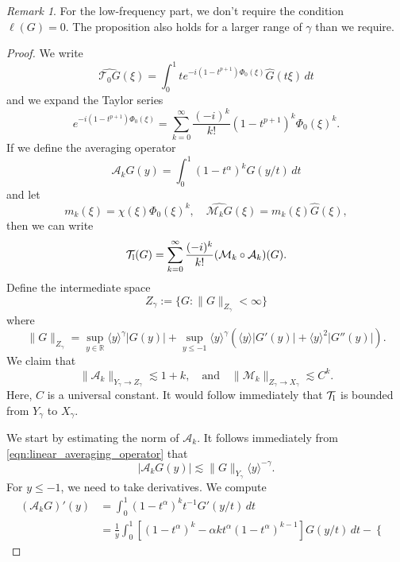 \documentclass[11pt]{amsart}
\theoremstyle{definition}
\theoremstyle{remark}
\newtheorem{remark}[theorem]{Remark}
\numberwithin{equation}{section}
\newcommand{\R}{\mathbb{R}}
\newcommand{\mc}[1]{\mathcal{#1}}
\newcommand{\ang}[1]{\langle #1 \rangle}
\begin{document}
\begin{remark}
    For the low-frequency part, we don't require the condition $\ell(G) = 0$. The proposition also holds for a larger range of $\gamma$ than we require.
\end{remark}

\begin{proof}
    We write 
    \[\widehat{\mc{T}_0 G}(\xi) = \int_0^1 t e^{-i(1-t^{p+1})\Phi_0(\xi)}
    \widehat G(t\xi)\,dt\]
    and we expand the Taylor series
    \[e^{-i(1 - t^{p + 1})\Phi_0(\xi)} = \sum_{k = 0}^{\infty} \frac{(-i)^k}{k!} (1 - t^{p + 1})^k \Phi_0(\xi)^k.\]
    If we define the averaging operator 
    \begin{equation}\label{eqn:linear_averaging_operator}\mc{A}_kG(y) = \int_{0}^{1}(1 - t^\alpha)^kG(y / t) \, dt\end{equation}
    and let 
    \begin{equation}\label{eqn:linear_low_frequency_multipliers}m_k(\xi) = \chi(\xi)\Phi_0(\xi)^k, \quad \widehat{\mc{M}_k G}(\xi) = m_k(\xi)\widehat{G}(\xi),\end{equation} 
    then we can write 
    \begin{equation}\label{eqn:linear_low_frequency_series}\mc{T}_{\textup{l}}(G) = \sum_{k = 0}^{\infty} \frac{(-i)^k}{k!} (\mc{M}_k \circ \mc{A}_k)(G).\end{equation}
    Define the intermediate space
    \[Z_\gamma := \{G : \|G\|_{Z_\gamma} < \infty\}\]
    where
    \[\|G\|_{Z_\gamma} = \sup_{y \in \R}\ang{y}^{\gamma}|G(y)| + \sup_{y \leq -1}\ang{y}^{\gamma}(\ang{y}|G'(y)| + \ang{y}^{2}|G''(y)|).\]
    We claim that
    \begin{equation}\label{eqn:linear_low_frequency_factor_bounds}\|\mc{A}_k\|_{Y_\gamma \to Z_\gamma} \lesssim 1 + k, \quad \text{and} \quad \|\mc{M}_k\|_{Z_\gamma \to X_\gamma} \lesssim C^k.\end{equation}
    Here, $C$ is a universal constant. It would follow immediately that $\mc{T}_{\textup{l}}$ is bounded from $Y_\gamma$ to $X_\gamma$. \par
    We start by estimating the norm of $\mc{A}_k$. It follows immediately from \eqref{eqn:linear_averaging_operator} that
    \[|\mc{A}_kG(y)| \lesssim \|G\|_{Y_\gamma} \ang{y}^{-\gamma}.\]
    For $y \leq - 1$, we need to take derivatives. We compute
    \begin{align*}
        (\mc{A}_kG)'(y) & = \int_{0}^{1}(1 - t^\alpha)^k t^{-1}G'(y / t) \, dt \\
        & = \frac{1}{y}\int_{0}^{1}\left[(1-t^\alpha)^k-\alpha k t^\alpha(1-t^\alpha)^{k-1}\right]G(y/t)\,dt - \begin{cases}

\end{cases}
\end{align*}
\end{proof}
\end{document}
